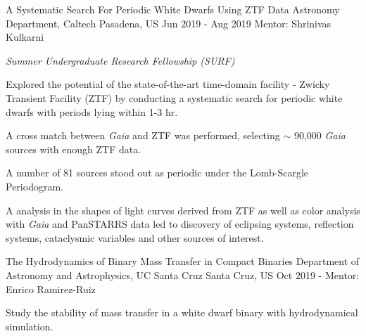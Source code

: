 \begin{cvexperiences}
\cvexperience
{A Systematic Search For Periodic White Dwarfs Using ZTF Data} %
{Astronomy Department, Caltech} %
{Pasadena, US} %
{Jun 2019 - Aug 2019} %
{Mentor: Shrinivas Kulkarni}
{ %
	\begin{cvitems}
		\item {\textit{Summer Undergraduate Research Fellowship (SURF)}}
		\item {Explored the potential of the state-of-the-art time-domain facility - Zwicky Transient Facility (ZTF) by conducting a systematic search for periodic white dwarfs with periods lying within 1-3 hr.}
		\item {A cross match between \textit{Gaia} and ZTF was performed, selecting $\sim$ 90,000 \textit{Gaia} sources with enough ZTF data.}
		\item {A number of 81 sources stood out as periodic under the Lomb-Scargle Periodogram. }
		\item {A analysis in the shapes of light curves derived from ZTF as well as color analysis with \textit{Gaia} and PanSTARRS data led to discovery of eclipsing systems, reflection systems, cataclysmic variables and other sources of interest.}
	\end{cvitems}
}

\cvexperience
{The Hydrodynamics of Binary Mass Transfer in Compact Binaries} %
{Department of Astronomy and Astrophysics, UC Santa Cruz} %
{Santa Cruz, US} %
{Oct 2019 -} %
{Mentor: Enrico Ramirez-Ruiz}
{ %
	\begin{cvitems}
		\item {Study the stability of mass transfer in a white dwarf binary with hydrodynamical simulation.}
	\end{cvitems}
}

\end{cvexperiences}